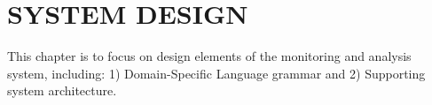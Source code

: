 %
%
%
%  
%

\chapter{\MakeUppercase{System Design}}
\label{cha:system-design}

This chapter is to focus on design elements of the monitoring and analysis system, including: 1) Domain-Specific Language grammar and 2) Supporting system architecture.